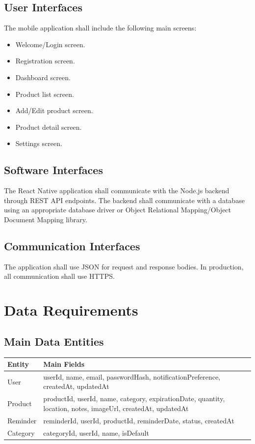 \documentclass[12pt]{article}
\begin{document}
\subsection{User Interfaces}
The mobile application shall include the following main screens:
\begin{itemize}
    \item Welcome/Login screen.
    \item Registration screen.
    \item Dashboard screen.
    \item Product list screen.
    \item Add/Edit product screen.
    \item Product detail screen.
    \item Settings screen.
\end{itemize}

\subsection{Software Interfaces}
The React Native application shall communicate with the Node.js backend through REST API endpoints. The backend shall communicate with a database using an appropriate database driver or Object Relational Mapping/Object Document Mapping library.

\subsection{Communication Interfaces}
The application shall use JSON for request and response bodies. In production, all communication shall use HTTPS.

\section{Data Requirements}

\subsection{Main Data Entities}
\begin{longtable}{|p{}|p{}|}
\hline
\textbf{Entity} & \textbf{Main Fields} \\
\hline
User & userId, name, email, passwordHash, notificationPreference, createdAt, updatedAt \\
\hline
Product & productId, userId, name, category, expirationDate, quantity, location, notes, imageUrl, createdAt, updatedAt \\
\hline
Reminder & reminderId, userId, productId, reminderDate, status, createdAt \\
\hline
Category & categoryId, userId, name, isDefault \\
\hline
\end{longtable}
\end{document}
